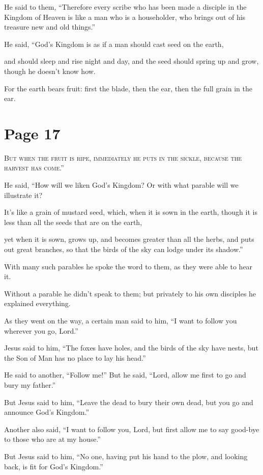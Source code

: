 He said to them, “Therefore every scribe who has been made a disciple in the Kingdom of Heaven is like a man who is a householder, who brings out of his treasure new and old things.”

He said, “God’s Kingdom is as if a man should cast seed on the earth,

and should sleep and rise night and day, and the seed should spring up and grow, though he doesn’t know how.

For the earth bears fruit: first the blade, then the ear, then the full grain in the ear.



\chapterornament
\section*{Page 17}

\lettrine{B}{ut when the fruit is ripe, immediately he puts in the sickle, because the harvest has come.”}

He said, “How will we liken God’s Kingdom? Or with what parable will we illustrate it?

It’s like a grain of mustard seed, which, when it is sown in the earth, though it is less than all the seeds that are on the earth,

yet when it is sown, grows up, and becomes greater than all the herbs, and puts out great branches, so that the birds of the sky can lodge under its shadow.”

With many such parables he spoke the word to them, as they were able to hear it.

Without a parable he didn’t speak to them; but privately to his own disciples he explained everything.

As they went on the way, a certain man said to him, “I want to follow you wherever you go, Lord.”

Jesus said to him, “The foxes have holes, and the birds of the sky have nests, but the Son of Man has no place to lay his head.”

He said to another, “Follow me!” But he said, “Lord, allow me first to go and bury my father.”

But Jesus said to him, “Leave the dead to bury their own dead, but you go and announce God’s Kingdom.”

Another also said, “I want to follow you, Lord, but first allow me to say good-bye to those who are at my house.”

But Jesus said to him, “No one, having put his hand to the plow, and looking back, is fit for God’s Kingdom.”

